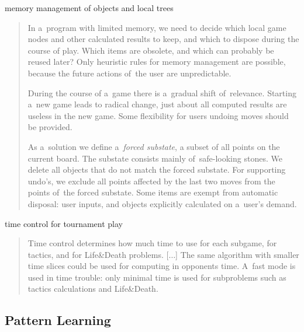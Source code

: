 \begin{enumerate}[(a)]
  \item memory management of objects and local trees
    \begin{quotation}
      In a~program with limited memory, we need to decide which local game nodes and other calculated results to keep, and which to dispose during the course of play.
      Which items are obsolete, and which can probably be reused later?
      Only heuristic rules for memory management are possible, because the future actions of~the user are unpredictable.

      During the course of a~game there is a~gradual shift of~relevance.
      Starting a~new game leads to radical change, just about all computed results are useless in the new game.
      Some flexibility for users undoing moves should be provided.

      As a~solution we define a~\emph{forced substate}, a subset of all points on the current board.
      The substate consists mainly of~safe-looking stones.
      We delete all objects that do not match the forced substate.
      For supporting undo’s, we exclude all points affected by the last two moves from the points of~the forced substate.
      Some items are exempt from automatic disposal:
      user inputs, and objects explicitly calculated on a~user’s demand.
    \end{quotation}

    \parbox{.9\textwidth}{
    \item time control for tournament play
      \begin{quotation}
        Time control determines how much time to use for each subgame, for tactics, and for
        Life\&Death problems. [$\dots$]
        The same algorithm with smaller time slices could be used for computing in opponents time.
        A~fast mode is used in time trouble:
        only minimal time is used for subproblems such as tactics calculations and Life\&Death.
      \end{quotation}
    }

\end{enumerate}

\subsection{Pattern Learning}

